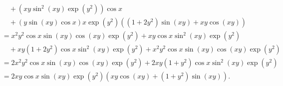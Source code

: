 {\begin{enumerate}
{\begin{align*}
&\quad
+
(xy \sin^2 (xy) \exp(y^2))
\cos x
\\
&\quad
+(y \sin (xy) \cos x)
x\exp(y^2)((1+2y^2)\sin(xy) +xy\cos(xy))
\\
&=
x^2y^2  \cos x\sin (xy) 
\cos (xy)\exp(y^2) +xy \cos x\sin^2 (xy) \exp(y^2)
\\
&\quad
+xy(1+2y^2)  \cos x \sin^2 (xy)
\exp(y^2)
+x^2y^2 \cos x\sin (xy)\cos(xy)\exp(y^2)
\\
&=
2 x^2y^2  \cos x\sin (xy) 
\cos (xy)\exp(y^2) +2xy(1+y^2) \cos x\sin^2 (xy) \exp(y^2)
\\
&=
2xy \cos x   \sin (xy)\exp(y^2)
(xy  \cos (xy) +(1+y^2)  \sin (xy) ) .
\end{align*}}
\end{enumerate}
}
